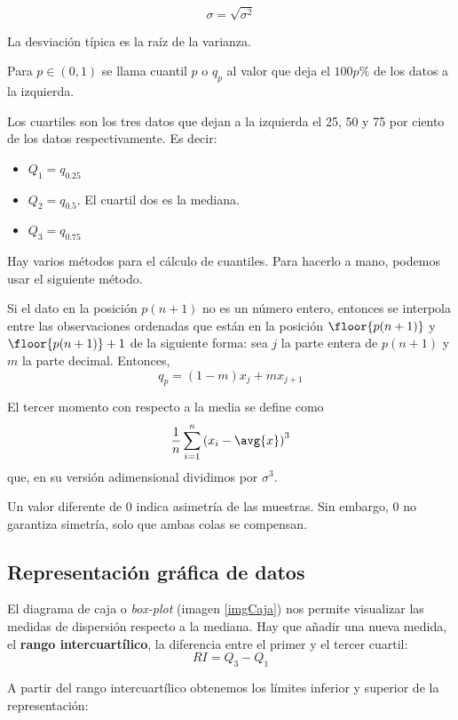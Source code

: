 \documentclass{apuntes}
\begin{document}
\begin{defn}
\[\sigma = \sqrt{\sigma^2} \]

La desviación típica es la raíz de la varianza.
\end{defn}

\begin{defn}[Cuantil]
Para $p\in (0, 1)$ se llama cuantil $p$ o $q_p$ al valor que deja el $100p \%$ de los datos a la izquierda.
\end{defn}

\begin{defn}[Cuartil]
Los cuartiles son los tres datos que dejan a la izquierda el 25, 50 y 75 por ciento de los datos respectivamente. Es decir:

\begin{itemize}
\item $Q_1 = q_{0.25}$
\item $Q_2 = q_{0.5}$. El cuartil dos es la mediana.
\item $Q_3 = q_{0.75}$
\end{itemize}
\end{defn}

Hay varios métodos para el cálculo de cuantiles. Para hacerlo a mano, podemos usar el siguiente método.

Si el dato en la posición $p(n+1)$ no es un número entero, entonces se interpola entre las observaciones ordenadas que están en la posición $\floor{p(n+1)}$ y $\floor{p(n+1)} + 1$ de la siguiente forma: sea $j$ la parte entera de $p(n+1)$ y $m$ la parte decimal. Entonces, \[ q_p = (1-m)x_j + m x_{j+1} \]


\begin{defn}
El tercer momento con respecto a la media se define como \[ \frac{1}{n}\sum_{i=1}^n\left(x_i-\avg{x}\right)^3 \] que, en su versión adimensional dividimos por $\sigma^3$.
\end{defn}

Un valor diferente de 0 indica asimetría de las muestras. Sin embargo, 0 no garantiza simetría, solo que ambas colas se compensan.

\subsection{Representación gráfica de datos}

\begin{defn}
El diagrama de caja o \textit{box-plot}  (imagen \ref{imgCaja}) nos permite visualizar las medidas de dispersión respecto a la mediana. Hay que añadir una nueva medida, el \textbf{rango intercuartílico}, la diferencia entre el primer y el tercer cuartil: \[RI = Q_3 - Q_1 \]

\newpage
A partir del rango intercuartílico obtenemos los límites inferior y superior de la representación:

\end{defn}
\end{document}
